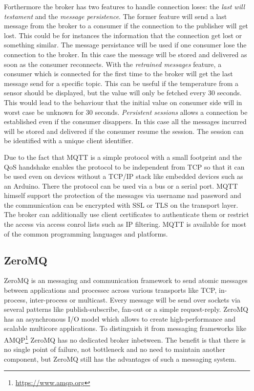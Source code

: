 Forthermore the broker has two features to handle connection loses: the \textit{last will testament} and the \textit{message persistence}.
The former feature will send a last message from the broker to a consumer if the connection to the publisher will get lost.
This could be for instances the information that the connection get lost or something similar.
The message persistance will be used if one consumer lose the connection to the broker.
In this case the message will be stored and delivered as soon as the consumer reconnects.
With the \textit{retrained messages} feature, a consumer which is connected for the first time to the broker will get the last message send for a specific topic. This can be useful if the temperature from a sensor should be displayed, but the value will only be fetched every 30 seconds. This would lead to the behaviour that the initial value on consumer side will in worst case be unknown for 30 seconds.
\textit{Persistent sessions} allows a connection be established even if the consumer disappers. In this case all the messages incurred will be stored and delivered if the consumer resume the session. The session can be identified with a unique client identifier.\autocite[cf.]{Bayer:MQTT}

Due to the fact that \ac{MQTT} is a simple protocol with a small footprint and the \ac{QoS} handshake enables the protocol to be independent from \acs{TCP} so that it can be used even on devices without a TCP/IP stack like embedded devices such as an Arduino.\autocite[cf.]{Bayer:MQTT}
There the protocol can be used via a bus or a serial port.\autocite[cf.]{Bayer:MQTT}
\ac{MQTT} himself support the protection of the messages via username nad password and the communication can be encrypted with \acs{SSL} or \acs{TLS} on the transport layer.\autocite[cf.]{Bayer:MQTT}
The broker can additionally use client certificates to authenticate them or restrict the access via access conrol lists such as \acs{IP} filtering.\autocite[cf.]{Bayer:MQTT}
\ac{MQTT} is available for most of the common programming languages and platforms.


\subsection{ZeroMQ}
\label{section:ZeroMQ}
ZeroMQ is an messaging and communication framework to send atomic messages between applications and processec across various transports like \ac{TCP}, in-process, inter-process or multicast.\autocite[cf.]{ZeroMQ:Guide}
Every message will be send over sockets via several patterns like publish-subscribe, fan-out or a simple request-reply.\autocite[cf.]{ZeroMQ:Guide}
ZeroMQ has an asynchronous I/O model which allows to create high-performance and scalable multicore applications.\autocite[cf.]{ZeroMQ:Guide}
To distinguish it from messaging frameworks like \ac{AMQP}\footnote{\url{https://www.amqp.org}} ZeroMQ has no dedicated broker inbetween.
The benefit is that there is no single point of failure, not bottleneck and no need to maintain another component, but ZeroMQ still has the advantages of such a messaging system.


